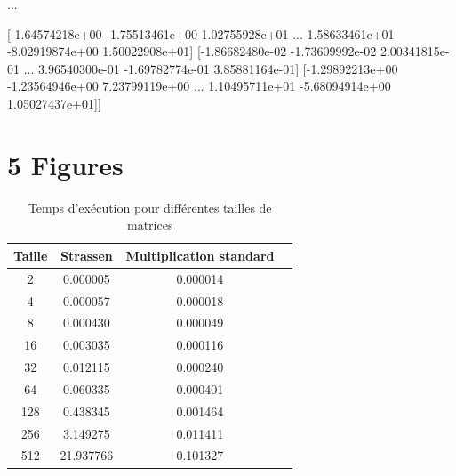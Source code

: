 \documentclass[a4paper,fleqn]{article}
\begin{document}
\begin{enumerate}
 ...
 
 [-1.64574218e+00 -1.75513461e+00  1.02755928e+01 ...  1.58633461e+01
  -8.02919874e+00  1.50022908e+01]
 [-1.86682480e-02 -1.73609992e-02  2.00341815e-01 ...  3.96540300e-01
  -1.69782774e-01  3.85881164e-01]
 [-1.29892213e+00 -1.23564946e+00  7.23799119e+00 ...  1.10495711e+01
  -5.68094914e+00  1.05027437e+01]]

\break
 
\section*{5 Figures}
\begin{table}[htbp]
  \centering
  \begin{tabular}{|c|c|c|c|}
    \hline
    Taille & Strassen & Multiplication standard \\
    \hline
    2 & 0.000005 & 0.000014 \\
    4 & 0.000057 & 0.000018 \\
    8 & 0.000430 & 0.000049 \\
    16 & 0.003035 & 0.000116 \\
    32 & 0.012115 & 0.000240 \\
    64 & 0.060335 & 0.000401 \\
    128 & 0.438345 & 0.001464 \\
    256 & 3.149275 & 0.011411 \\
    512 & 21.937766 & 0.101327 \\
    \hline
  \end{tabular}
    \caption{Temps d'exécution pour différentes tailles de matrices}
\end{table}


\end{enumerate}
\end{document}
